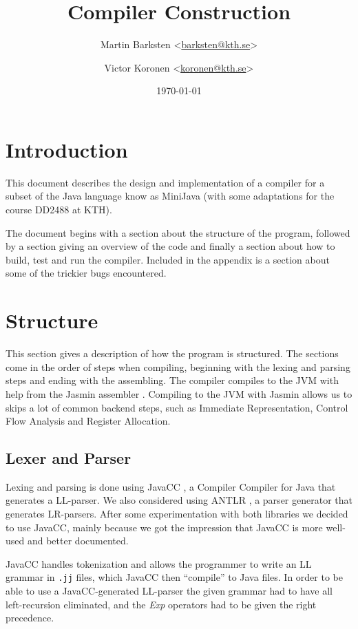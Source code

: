 \documentclass[a4paper]{article}
\title{Compiler Construction}
\author{%
    Martin Barksten <\href{mailto:barksten@kth.se}{barksten@kth.se}> \and
    Victor Koronen <\href{mailto:koronen@kth.se}{koronen@kth.se}>
}
\date{\today}
\begin{document}
\maketitle
\thispagestyle{empty}

\section{Introduction}

This document describes the design and implementation of a compiler for a subset
of the Java language know as MiniJava \cite{minijavaproject} (with some
adaptations \cite{dd2488project} for the course DD2488 at KTH).

The document begins with a section about the structure of the program, followed
by a section giving an overview of the code and finally a section about how to
build, test and run the compiler. Included in the appendix is a section about some
of the trickier bugs encountered.

\section{Structure}

This section gives a description of how the program is structured. The sections
come in the order of steps when compiling, beginning with the lexing and parsing
steps and ending with the assembling. The compiler compiles to the JVM with help
from the Jasmin assembler \cite{jasmin}. Compiling to the JVM with Jasmin
allows us to skips a lot of common backend steps, such as Immediate Representation,
Control Flow Analysis and Register Allocation.

\subsection{Lexer and Parser}

Lexing and parsing is done using JavaCC \cite{javacc}, a Compiler Compiler for
Java that generates a LL-parser. We also considered using ANTLR \cite{antlr}, a
parser generator that generates LR-parsers. After some experimentation with both
libraries we decided to use JavaCC, mainly because we got the impression that
JavaCC is more well-used and better documented.

JavaCC handles tokenization and allows the programmer to write an LL grammar in
\texttt{.jj} files, which JavaCC then ``compile'' to Java files. In order
to be able to use a JavaCC-generated LL-parser the given grammar had to
have all left-recursion eliminated, and the \textit{Exp} operators had to be given the
right precedence.
\end{document}
